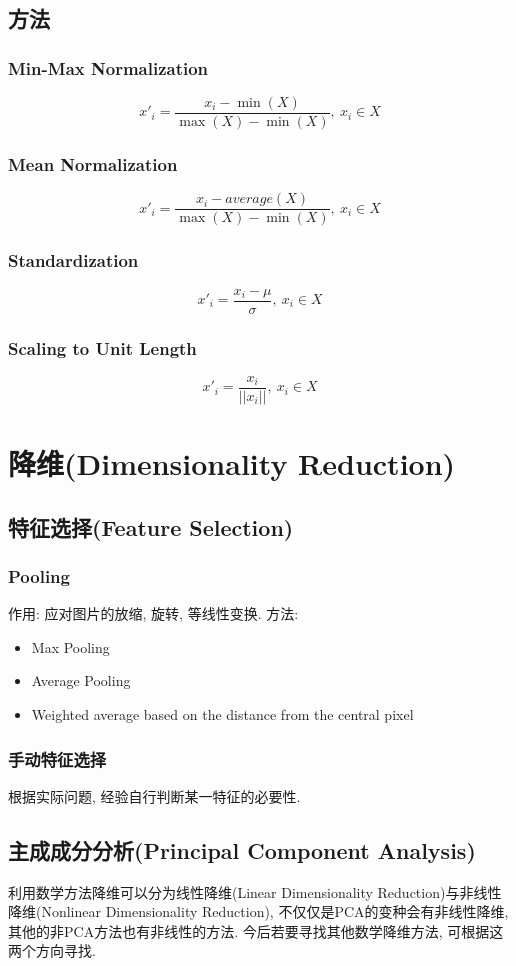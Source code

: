 \documentclass[oneside]{book}
\begin{document}
			\subsection{方法}
				\subsubsection{Min-Max Normalization}
					$$x'_i = \frac{x_i - \min{(X)}}{\max{(X)} - \min{(X)}},~x_i\in X$$
				\subsubsection{Mean Normalization}
					$$x'_i = \frac{x_i - average(X)}{\max{(X)} - \min{(X)}},~x_i\in X$$
				\subsubsection{Standardization}
					$$x'_i = \frac{x_i - \mu}{\sigma},~x_{i}\in X$$
				\subsubsection{Scaling to Unit Length}
				 	$$x'_i = \frac{x_{i}}{||x_{i}||}, ~x_i \in X$$
		\section{降维(Dimensionality Reduction)}
			\subsection{特征选择(Feature Selection)}
				\subsubsection{Pooling}
					作用: 应对图片的放缩, 旋转, 等线性变换.
					方法:
					\begin{itemize}
						\item Max Pooling
						\item Average Pooling
						\item Weighted average based on the distance from the central pixel
					\end{itemize}
				\subsubsection{手动特征选择}
					根据实际问题, 经验自行判断某一特征的必要性.
				\subsection{主成成分分析(Principal Component Analysis)}
					利用数学方法降维可以分为线性降维(Linear Dimensionality Reduction)与非线性降维(Nonlinear Dimensionality Reduction), 不仅仅是PCA的变种会有非线性降维, 其他的非PCA方法也有非线性的方法. 今后若要寻找其他数学降维方法, 可根据这两个方向寻找.
\end{document}
